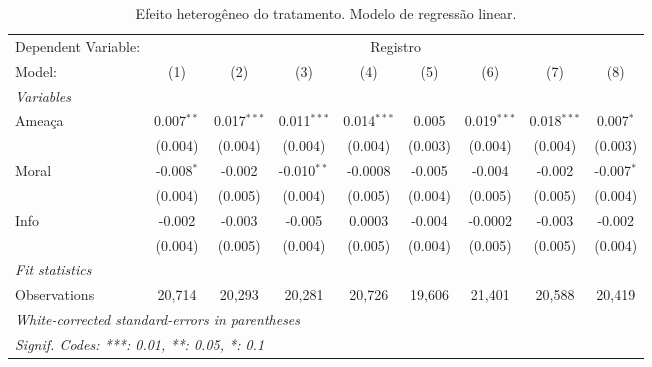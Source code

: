 \begin{table}[htbp]\centering
\caption{\label{tab:tabc1} Efeito heterogêneo do tratamento. Modelo de regressão linear.}
\begin{tabular}{lcccccccc}
\tabularnewline\toprule\toprule
Dependent Variable:&\multicolumn{8}{c}{Registro}\\
Model:&(1) & (2) & (3) & (4) & (5) & (6) & (7) & (8)\\
\midrule
\emph{Variables}&  & & & & & & & \\
Ameaça&0.007$^{**}$&0.017$^{***}$&0.011$^{***}$&0.014$^{***}$&0.005&0.019$^{***}$&0.018$^{***}$&0.007$^{*}$\\
  &(0.004)&(0.004)&(0.004)&(0.004)&(0.003)&(0.004)&(0.004)&(0.003)\\
Moral&-0.008$^{*}$&-0.002&-0.010$^{**}$&-0.0008&-0.005&-0.004&-0.002&-0.007$^{*}$\\
  &(0.004)&(0.005)&(0.004)&(0.005)&(0.004)&(0.005)&(0.005)&(0.004)\\
Info&-0.002&-0.003&-0.005&0.0003&-0.004&-0.0002&-0.003&-0.002\\
  &(0.004)&(0.005)&(0.004)&(0.005)&(0.004)&(0.005)&(0.005)&(0.004)\\
\midrule
\emph{Fit statistics}&  & & & & & & & \\
Observations& 20,714&20,293&20,281&20,726&19,606&21,401&20,588&20,419\\
\bottomrule\bottomrule
\multicolumn{9}{l}{\emph{White-corrected standard-errors in parentheses}}\\
\multicolumn{9}{l}{\emph{Signif. Codes: ***: 0.01, **: 0.05, *: 0.1}}\\
\end{tabular}
\end{table}